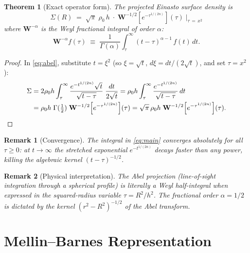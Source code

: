 \documentclass{article}
\newtheorem{theorem}{Theorem}
\newtheorem{remark}{Remark}
\begin{document}
\begin{theorem}[Exact operator form]\label{thm:main}
The projected Einasto surface density is
\begin{equation}\label{eq:main}
\boxed{\;
\Sigma(R) \;=\; \sqrt{\pi}\;\rho_0\,h \;\cdot\;
\mathbf{W}^{-1/2}\!\left[e^{-\tau^{1/(2n)}}\right]\!(\tau)
\;\bigg|_{\tau\,=\,x^2}
\;}
\end{equation}
where $\mathbf{W}^{-\alpha}$ is the Weyl fractional integral of order $\alpha$:
\begin{equation}\label{eq:weyl-def}
\mathbf{W}^{-\alpha}f(\tau) \;\equiv\;
\frac{1}{\Gamma(\alpha)}\int_\tau^\infty (t-\tau)^{\alpha-1}\,f(t)\,dt.
\end{equation}
\end{theorem}

\begin{proof}
In \eqref{eq:abel}, substitute $t = \xi^2$
(so $\xi = \sqrt{t}$, $d\xi = dt/(2\sqrt{t})$, and set $\tau = x^2$):
\begin{align}
\Sigma &= 2\rho_0 h\int_\tau^\infty
  \frac{e^{-t^{1/(2n)}}\sqrt{t}}{\sqrt{t-\tau}}\;\frac{dt}{2\sqrt{t}}
= \rho_0 h\int_\tau^\infty \frac{e^{-t^{1/(2n)}}}{\sqrt{t-\tau}}\,dt \notag\\
&= \rho_0 h\;\Gamma({\textstyle\frac{1}{2}})\;
   \mathbf{W}^{-1/2}\!\left[e^{-\tau^{1/(2n)}}\right]\!(\tau)
= \sqrt{\pi}\,\rho_0 h\;\mathbf{W}^{-1/2}\!\left[e^{-\tau^{1/(2n)}}\right]\!(\tau).
\qedhere
\end{align}
\end{proof}

\begin{remark}[Convergence]
The integral in \eqref{eq:main} converges absolutely for all $\tau \ge 0$:
at $t\to\infty$ the stretched exponential $e^{-t^{1/(2n)}}$ decays faster than
any power, killing the algebraic kernel $(t-\tau)^{-1/2}$.
\end{remark}

\begin{remark}[Physical interpretation]
The Abel projection (line-of-sight integration through a spherical profile) is
\emph{literally} a Weyl half-integral when expressed in the squared-radius
variable $\tau = R^2/h^2$. The fractional order $\alpha = 1/2$ is dictated by
the kernel $(r^2-R^2)^{-1/2}$ of the Abel transform.
\end{remark}

\section{Mellin--Barnes Representation}
\label{sec:mellin}
\end{document}
